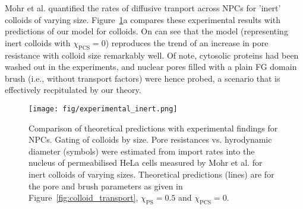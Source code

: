 \documentclass[12pt, a4paper]{article}
\begin{document}
Mohr et al. quantified the rates of diffusive tranport across NPCs for 'inert' colloids of varying size. Figure~\ref{fig:NPC_comparison}a compares these experimental results with predictions of our model for colloids.
On can see that the model (representing inert colloids with $\chi_{\text{PCS}} = 0$) reproduces the trend of an increase in pore resistance with colloid size remarkably well.
Of note, cytosolic proteins had been washed out in the experiments, and nuclear pores filled with a plain FG domain brush (i.e., without transport factors) were hence probed, a scenario that is effectively recpitulated by our theory. 


\begin{figure}
    \centering
    \texttt{[image: fig/experimental\_inert.png]}
    \caption{
    Comparison of theoretical predictions with experimental findings for NPCs. Gating of colloids by size.
    Pore resistances vs. hyrodynamic diameter (symbols) were estimated from import rates into the nucleus of permeabilised HeLa cells measured by Mohr et al. for inert colloids of varying sizes.
    Theoretical predictions (lines) are for the pore and brush parameters as given in Figure~\ref{fig:colloid_transport}, $\chi_{\text{PS}} = 0.5$ and $\chi_{\text{PCS}} = 0$.
    }
    \label{fig:NPC_comparison}
\end{figure}
\end{document}
